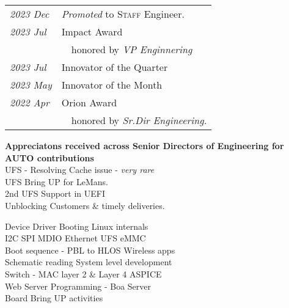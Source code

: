 %
%
%
%
%
\small{
   \begin{tabularx}{\textwidth}{X l}
      \textit{2023 Dec} & \emph{Promoted} to \textsc{Staff} Engineer.\\
      \textit{2023 Jul} & Impact Award \\
      & {~~}{\footnotesize honored by \textit{VP Enginnering}} \\        %
      \textit{2023 Jul} & Innovator of the Quarter \\
      \textit{2023 May} & Innovator of the Month \\
      \textit{2022 Apr} & Orion Award \\
      & {~~}{\footnotesize honored by \textit{Sr.Dir Engineering.}} \\
   \end{tabularx}
} %

%
%
%
%
\footnotesize{
   \textbf{Appreciatons received across Senior Directors of Engineering for AUTO contributions} \\
   \textbullet UFS - Resolving Cache issue - \emph{very rare} \\
   \textbullet UFS \textendash{} Bring UP for LeMans. \\
   \textbullet 2nd UFS Support in UEFI \\
   \textbullet Unblocking Customers \& timely deliveries.
}

%
%
%
%
   \textbullet Device Driver \textbullet Booting \textbullet Linux internals \\
   \textbullet I2C \textbullet SPI \textbullet MDIO \textbullet Ethernet \textbullet UFS \textbullet eMMC \\ 
   \textbullet Boot sequence - PBL to HLOS \textbullet Wireless apps\\
   \textbullet Schematic reading \textbullet System level development \\
   \textbullet Switch - MAC layer 2 \& Layer 4 \textbullet ASPICE \\
   \textbullet Web Server Programming - Boa Server \\
   \textbullet Board Bring UP activities \\
\sectionsep

